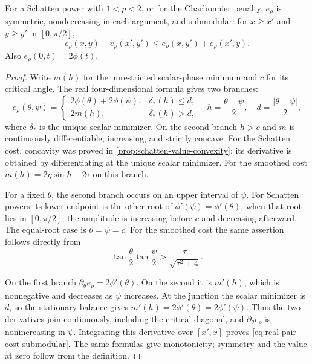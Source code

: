 \begin{lemma}
\label{lem:real-pair-cost-submodular}
For a Schatten power with $1<p<2$, or for the Charbonnier penalty,
$e_\rho$ is symmetric, nondecreasing in each argument, and submodular:
for $x\geq x'$ and $y\geq y'$ in $[0,\pi/2]$,
\begin{equation}
 e_\rho(x,y)+e_\rho(x',y')
       \leq e_\rho(x,y')+e_\rho(x',y).
 \label{eq:real-pair-cost-submodular}
\end{equation}
Also $e_\rho(0,t)=2\phi(t)$.
\end{lemma}

\begin{proof}
Write $m(h)$ for the unrestricted scalar-phase minimum and $c$ for its
critical angle. The real four-dimensional formula gives two branches:
\[
 e_\rho(\theta,\psi)=
 \begin{cases}
  2\phi(\theta)+2\phi(\psi),&\delta_*(h)\leq d,\\
  2m(h),&\delta_*(h)>d,
 \end{cases}
 \quad h=\frac{\theta+\psi}{2},\quad d=\frac{|\theta-\psi|}{2},
\]
where $\delta_*$ is the unique scalar minimizer. On the second branch
$h>c$ and $m$ is continuously differentiable, increasing, and strictly
concave. For the Schatten cost, concavity was proved in
\cref{prop:schatten-value-convexity}; its derivative is obtained by
differentiating at the unique scalar minimizer. For the smoothed cost
$m(h)=2\eta\sin h-2\tau$ on this branch.

For a fixed $\theta$, the second branch occurs on an upper interval of
$\psi$. For Schatten powers its lower endpoint is the other root of
$\phi'(\psi)=\phi'(\theta)$, when that root lies in $[0,\pi/2]$;
the amplitude is increasing before $c$ and decreasing afterward.
The equal-root case is $\theta=\psi=c$.
For the smoothed cost the same assertion follows directly from
\[
 \tan\frac\theta2\tan\frac\psi2
       >\frac{\tau}{\sqrt{\tau^2+4}}.
\]

On the first branch $\partial_\theta e_\rho=2\phi'(\theta)$.
On the second it is $m'(h)$, which is nonnegative and decreases as
$\psi$ increases. At the junction the scalar minimizer is $d$, so
the stationary balance gives
$m'(h)=2\phi'(\theta)=2\phi'(\psi)$.
Thus the two derivatives join continuously, including the critical
diagonal, and $\partial_\theta e_\rho$ is nonincreasing in $\psi$.
Integrating this derivative over $[x',x]$ proves
\cref{eq:real-pair-cost-submodular}. The same formulas give monotonicity;
symmetry and the value at zero follow from the definition.
\end{proof}

